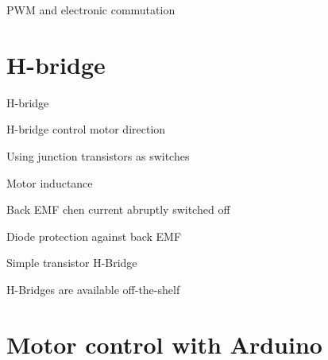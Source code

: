 \documentclass[compress]{beamer}
\begin{document}
{
    \begin{frame}{PWM and electronic commutation}
    \end{frame}
}

\section{H-bridge}

{
    \begin{frame}{H-bridge}
    \end{frame}
}


{
    \begin{frame}{H-bridge control motor direction}
    \end{frame}
}


{
    \begin{frame}{Using junction transistors as switches}
    \end{frame}
}


{
    \begin{frame}{Motor inductance}
    \end{frame}
}


{
    \begin{frame}{Back EMF chen current abruptly switched off}
    \end{frame}
}


{
    \begin{frame}{Diode protection against back EMF}
    \end{frame}
}


{
    \begin{frame}{Simple transistor H-Bridge}
    \end{frame}
}


{
    \begin{frame}{H-Bridges are available off-the-shelf}
    \end{frame}
}


\section{Motor control with Arduino}
\end{document}
